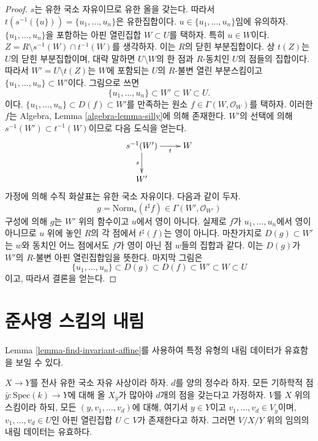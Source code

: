 \begin{proof}
$s$는 유한 국소 자유이므로 유한 올을 갖는다. 따라서 $t(s^{-1}(\{u\})) = \{u_1, \ldots, u_n\}$은 유한집합이다.
$u \in \{u_1, \ldots, u_n\}$임에 유의하자. $\{u_1, \ldots, u_n\}$을 포함하는 아핀 열린집합
$W \subset U$를 택하자. 특히 $u \in W$이다. $Z = R \setminus s^{-1}(W) \cap t^{-1}(W)$를 생각하자.
이는 $R$의 닫힌 부분집합이다. 상 $t(Z)$는 $U$의 닫힌 부분집합이며, 대략 말하면 $U \setminus W$의 한 점과
$R$-동치인 $U$의 점들의 집합이다. 따라서 $W' = U \setminus t(Z)$는 $W$에 포함되는 $U$의
$R$-불변 열린 부분스킴이고 $\{u_1, \ldots, u_n\} \subset W'$이다. 그림으로 쓰면
$$
\{u_1, \ldots, u_n\} \subset W' \subset W \subset U.
$$
이다. $\{u_1, \ldots, u_n\} \subset D(f) \subset W'$를 만족하는 원소
$f \in \Gamma(W, \mathcal{O}_W)$를 택하자. 이러한 $f$는 Algebra, Lemma \ref{algebra-lemma-silly}에 의해 존재한다.
$W'$의 선택에 의해 $s^{-1}(W') \subset t^{-1}(W)$이므로 다음 도식을 얻는다.
$$
\xymatrix{
s^{-1}(W') \ar[d]_s \ar[r]_-t & W \\
W'
}
$$
가정에 의해 수직 화살표는 유한 국소 자유이다. 다음과 같이 두자.
$$
g = \text{Norm}_s(t^\sharp f) \in \Gamma(W', \mathcal{O}_{W'})
$$
구성에 의해 $g$는 $W'$ 위의 함수이고 $u$에서 영이 아니다. 실제로 $f$가 $u_1, \ldots, u_n$에서 영이 아니므로
$u$ 위에 놓인 $R$의 각 점에서 $t^\sharp(f)$는 영이 아니다. 마찬가지로 $D(g) \subset W'$는 $w$와 동치인
어느 점에서도 $f$가 영이 아닌 점 $w$들의 집합과 같다. 이는 $D(g)$가 $W'$의 $R$-불변 아핀 열린집합임을 뜻한다.
마지막 그림은
$$
\{u_1, \ldots, u_n\} \subset D(g) \subset D(f) \subset W' \subset W \subset U
$$
이고, 따라서 결론을 얻는다.
\end{proof}







\section{준사영 스킴의 내림}
\label{section-quasi-projective}

\noindent
Lemma \ref{lemma-find-invariant-affine}를 사용하여 특정 유형의 내림 데이터가 유효함을 보일 수 있다.

\begin{lemma}
\label{lemma-descend-along-finite-with-bound}
$X \to Y$를 전사 유한 국소 자유 사상이라 하자. $d$를 양의 정수라 하자. 모든 기하학적 점
$\bar{y} : \mathrm{Spec}(k) \to Y$에 대해 올 $X_{\bar{y}}$가 많아야 $d$개의 점을 갖는다고 가정하자.
$V$를 $X$ 위의 스킴이라 하되, 모든 $(y, v_1, \ldots, v_d)$에 대해, 여기서 $y \in Y$이고
$v_1, \ldots, v_d \in V_y$이며, $v_1, \ldots, v_d \in U$인 아핀 열린집합 $U \subset V$가 존재한다고 하자.
그러면 $V/X/Y$ 위의 임의의 내림 데이터는 유효하다.
\end{lemma}

